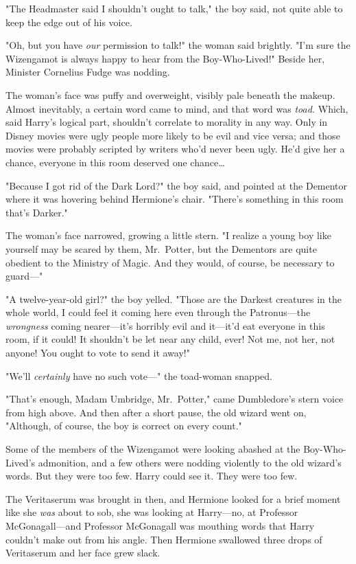 "The Headmaster said I shouldn't ought to talk," the boy said, not quite able 
to keep the edge out of his voice.

"Oh, but you have \emph{our} permission to talk!" the woman said brightly. "I'm 
sure the Wizengamot is always happy to hear from the Boy-Who-Lived!" Beside 
her, Minister Cornelius Fudge was nodding.

The woman's face was puffy and overweight, visibly pale beneath the makeup. 
Almost inevitably, a certain word came to mind, and that word was \emph{toad.} 
Which, said Harry's logical part, shouldn't correlate to morality in any way. 
Only in Disney movies were ugly people more likely to be evil and vice versa; 
and those movies were probably scripted by writers who'd never been ugly. He'd 
give her a chance, everyone in this room deserved one chance{\ldots}

"Because I got rid of the Dark Lord?" the boy said, and pointed at the Dementor 
where it was hovering behind Hermione's chair. "There's something in this room 
that's Darker."

The woman's face narrowed, growing a little stern. "I realize a young boy like 
yourself may be scared by them, Mr.~Potter, but the Dementors are quite 
obedient to the Ministry of Magic. And they would, of course, be necessary to 
guard---"

"A twelve-year-old girl?" the boy yelled. "Those are the Darkest creatures in 
the whole world, I could feel it coming here even through the Patronus---the 
\emph{wrongness} coming nearer---it's horribly evil and it---it'd eat everyone 
in this room, if it could! It shouldn't be let near any child, ever! Not me, 
not her, not anyone! You ought to vote to send it away!"

"We'll \emph{certainly} have no such vote---" the toad-woman snapped.

"That's enough, Madam Umbridge, Mr.~Potter," came Dumbledore's stern voice from 
high above. And then after a short pause, the old wizard went on, "Although, of 
course, the boy is correct on every count."

Some of the members of the Wizengamot were looking abashed at the 
Boy-Who-Lived's admonition, and a few others were nodding violently to the old 
wizard's words. But they were too few. Harry could see it. They were too few.

The Veritaserum was brought in then, and Hermione looked for a brief moment 
like she \emph{was} about to sob, she was looking at Harry---no, at Professor 
McGonagall---and Professor McGonagall was mouthing words that Harry couldn't 
make out from his angle. Then Hermione swallowed three drops of Veritaserum and 
her face grew slack.


